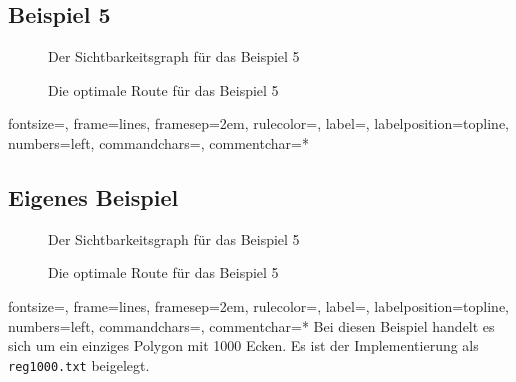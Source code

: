\documentclass[a4paper, notitlepage, 12pt]{scrartcl}
\begin{document}
\subsection{Beispiel 5}
\begin{minipage}[b]{0.45\linewidth}
	\begin{figure}[H]
		
		\caption{Der Sichtbarkeitsgraph für das Beispiel 5}
	\end{figure}
\end{minipage}
\hspace{0.5cm}
\begin{minipage}[b]{0.45\linewidth}
	\begin{figure}[H] 
		\caption{Die optimale Route für das Beispiel 5}
	\end{figure}
\end{minipage}
{fontsize=\footnotesize,
	frame=lines,  %
	framesep=2em, %
	rulecolor=\color{Gray},
	label=,
	labelposition=topline,
	numbers=left,
	commandchars=\|\(\), %
	commentchar=*        %
}
\subsection*{Eigenes Beispiel}
\begin{minipage}[b]{0.45\linewidth}
	\begin{figure}[H]
		
		\caption{Der Sichtbarkeitsgraph für das Beispiel 5}
	\end{figure}
\end{minipage}
\hspace{0.5cm}
\begin{minipage}[b]{0.45\linewidth}
	\begin{figure}[H] 
		\caption{Die optimale Route für das Beispiel 5}
	\end{figure}
\end{minipage}
%
{fontsize=\footnotesize,
	frame=lines,  %
	framesep=2em, %
	rulecolor=\color{Gray},
	label=,
	labelposition=topline,
	numbers=left,
	commandchars=\|\(\), %
	commentchar=*        %
}
Bei diesen Beispiel handelt es sich um ein einziges Polygon mit 1000 Ecken. Es ist der Implementierung als \texttt{reg1000.txt} beigelegt.
\end{document}
